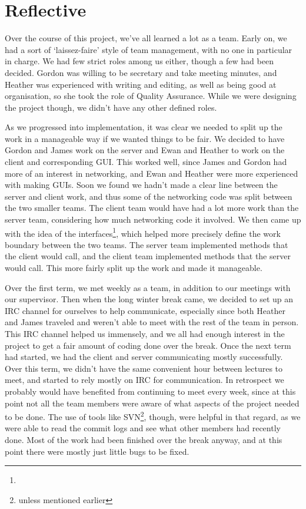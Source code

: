 \section{Reflective}
Over the course of this project, we've all learned a lot as a team. Early on, we had a sort of `laissez-faire' style of team management, with no one in particular in charge. We had few strict roles among us either, though a few had been decided. Gordon was willing to be secretary and take meeting minutes, and Heather was experienced with writing and editing, as well as being good at organisation, so she took the role of Quality Assurance. While we were designing the project though, we didn't have any other defined roles.

As we progressed into implementation, it was clear we needed to split up the work in a manageable way if we wanted things to be fair. We decided to have Gordon and James work on the server and Ewan and Heather to work on the client and corresponding GUI. This worked well, since James and Gordon had more of an interest in networking, and Ewan and Heather were more experienced with making GUIs. Soon we found we hadn't made a clear line between the server and client work, and thus some of the networking code was split between the two smaller teams. The client team would have had a lot more work than the server team, considering how much networking code it involved. We then came up with the idea of the interfaces\footnote{}, which helped more precisely define the work boundary between the two teams. The server team implemented methods that the client would call, and the client team implemented methods that the server would call. This more fairly split up the work and made it manageable.

Over the first term, we met weekly as a team, in addition to our meetings with our supervisor. Then when the long winter break came, we decided to set up an IRC channel for ourselves to help communicate, especially since both Heather and James traveled and weren't able to meet with the rest of the team in person. This IRC channel helped us immensely, and we all had enough interest in the project to get a fair amount of coding done over the break. Once the next term had started, we had the client and server communicating mostly successfully. Over this term, we didn't have the same convenient hour between lectures to meet, and started to rely mostly on IRC for communication. In retrospect we probably would have benefited from continuing to meet every week, since at this point not all the team members were aware of what aspects of the project needed to be done. The use of tools like SVN\footnote{unless mentioned earlier}, though, were helpful in that regard, as we were able to read the commit logs and see what other members had recently done. Most of the work had been finished over the break anyway, and at this point there were mostly just little bugs to be fixed.

